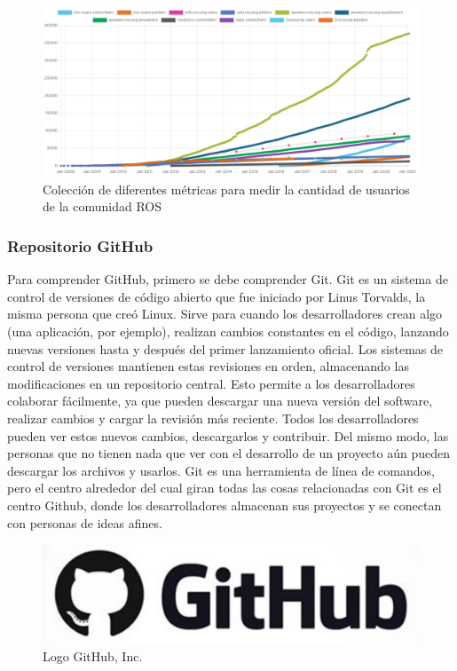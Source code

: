         \begin{figure}[htb]
            \centering
            \includegraphics[width=1.0\linewidth]{Main/Chapter3/Images3/cap3_estadisticas_4.png}
            \caption{Colección de diferentes métricas para medir la cantidad de usuarios de la comunidad ROS \cite{rosmetrics}}
            \label{f:Cap3-5_estadisticas_5}
        \end{figure}  
        
        \newpage

        \subsubsection{Repositorio GitHub}
            Para comprender GitHub, primero se debe comprender Git. Git es un sistema de control de versiones de código abierto que fue iniciado por Linus Torvalds, la misma persona que creó Linux. Sirve para cuando los desarrolladores crean algo (una aplicación, por ejemplo), realizan cambios constantes en el código, lanzando nuevas versiones hasta y después del primer lanzamiento oficial. Los sistemas de control de versiones mantienen estas revisiones en orden, almacenando las modificaciones en un repositorio central. Esto permite a los desarrolladores colaborar fácilmente, ya que pueden descargar una nueva versión del software, realizar cambios y cargar la revisión más reciente. Todos los desarrolladores pueden ver estos nuevos cambios, descargarlos y contribuir. Del mismo modo, las personas que no tienen nada que ver con el desarrollo de un proyecto aún pueden descargar los archivos y usarlos. Git es una herramienta de línea de comandos, pero el centro alrededor del cual giran todas las cosas relacionadas con Git es el centro Github, donde los desarrolladores almacenan sus proyectos y se conectan con personas de ideas afines.
    
            \begin{figure}[htb]
            \centering
            \includegraphics[width=0.21\linewidth]{Main/Chapter3/Images3/repo_git_1.png}
            \caption{Logo GitHub, Inc.}
            \label{f:Cap3-5_estadisticas_8}
            \end{figure} 
        
